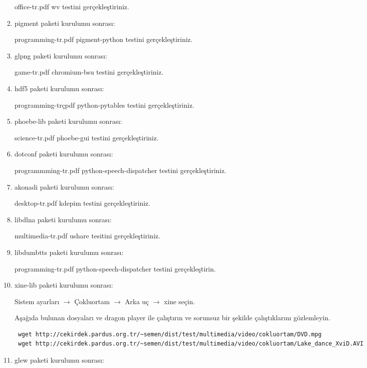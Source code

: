 \documentclass[a4paper,10pt]{article}
\begin{document}
\begin{enumerate}
office-tr.pdf wv testini gerçekleştiriniz.

\item pigment paketi kurulumu sonrası:

programming-tr.pdf pigment-python testini gerçekleştiriniz.

\item glpng paketi kurulumu sonrası:

game-tr.pdf chromium-bsu testini gerçekleştiriniz.

\item hdf5 paketi kurulumu sonrası:

programming-trçpdf python-pytables testini gerçekleştiriniz.

\item phoebe-lib paketi kurulumu sonrası:

science-tr.pdf phoebe-gui testini gerçekleştiriniz.

\item dotconf paketi kurulumu sonrası:

programmming-tr.pdf python-speech-dispatcher testini gerçekleştiriniz.

\item akonadi paketi kurulumu sonrası:

desktop-tr.pdf kdepim testini gerçekleştiriniz.

\item libdlna paketi kurulumu sonrası:

multimedia-tr.pdf ushare tesitini gerçekleştiriniz.

\item libdumbtts paketi kurulumu sonrası:

programming-tr.pdf python-speech-dispatcher testini gerçekleştirin.

\item xine-lib paketi kurulumu sonrası:

Sistem ayarları $\rightarrow$ Çokluortam $\rightarrow$ Arka uç $\rightarrow$ xine seçin. 

Aşağıda bulunan dosyaları ve dragon player ile çalıştırın ve sorunsuz bir şekilde çalıştıklarını gözlemleyin.

\begin{verbatim}
 wget http://cekirdek.pardus.org.tr/~semen/dist/test/multimedia/video/cokluortam/DVD.mpg
 wget http://cekirdek.pardus.org.tr/~semen/dist/test/multimedia/video/cokluortam/Lake_dance_XviD.AVI
\end{verbatim}


\item glew paketi kurulumu sonrası:


\end{enumerate}
\end{document}
